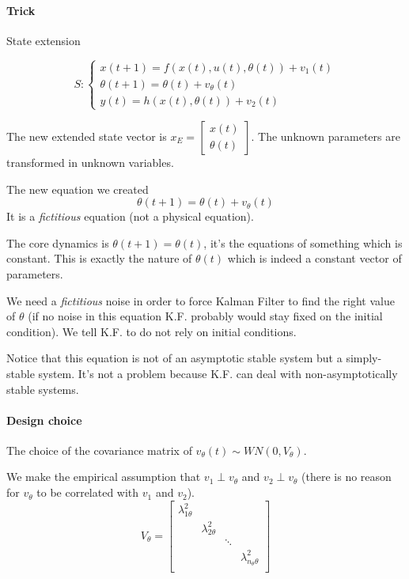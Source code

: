 \paragraph{Trick} State extension

\[
    S: \begin{cases}
        x(t+1) = f(x(t), u(t), \theta(t)) + v_1(t) \\
        \theta(t+1) = \theta(t) + v_\theta(t) \\
        y(t) = h(x(t), \theta(t)) + v_2(t)
    \end{cases}
\]

The new extended state vector is $x_E = \begin{bmatrix} x(t) \\ \theta(t) \end{bmatrix}$.
The unknown parameters are transformed in unknown variables.

The new equation we created
\[
    \theta(t+1) = \theta(t) + v_\theta(t)
\]
It is a \emph{fictitious} equation (not a physical equation).

The core dynamics is $\theta(t+1)=\theta(t)$, it's the equations of something which is constant.
This is exactly the nature of $\theta(t)$ which is indeed a constant vector of parameters.

We need a \emph{fictitious} noise in order to force Kalman Filter to find the right value of $\theta$ (if no noise in this equation K.F. probably would stay fixed on the initial condition).
We tell K.F. to do not rely on initial conditions.

Notice that this equation is not of an asymptotic stable system but a simply-stable system.
It's not a problem because K.F. can deal with non-asymptotically stable systems.

\paragraph{Design choice} The choice of the covariance matrix of $v_\theta(t) \sim WN(0, V_\theta)$.

We make the empirical assumption that $v_1 \perp v_\theta$ and $v_2 \perp v_\theta$ (there is no reason for $v_\theta$ to be correlated with $v_1$ and $v_2$).
\[
    V_\theta = \begin{bmatrix}
        \lambda_{1\theta}^2 & & & \\
        & \lambda_{2\theta}^2 & & \\
        & & \ddots & \\
        & & & \lambda_{n_\theta\theta}^2\\
    \end{bmatrix}
\]


